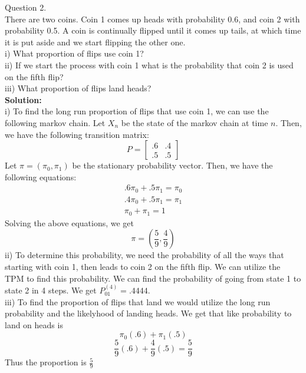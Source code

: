 \documentclass[answers,12pt,addpoints]{exam}
\begin{document}
\begin{questions}
\question Question 2.\\
There are two coins. Coin 1 comes up heads with probability 0.6, and coin 2 with probability 0.5.
A coin is continually flipped until it comes up tails, at which time it is put aside and we start
flipping the other one.\\
i) What proportion of flips use coin 1?\\
ii)  If we start the process with coin 1 what is the probability that coin 2 is used on the fifth flip? \\
iii) What proportion of flips land heads?\\
\textbf{Solution:}\\
i) To find the long run proportion of flips that use coin 1, we can use the following markov chain. Let $X_n$ be the state of the markov chain at time $n$. Then, we have the following transition matrix:
$$P = \begin{bmatrix}
    .6 & .4\\
    .5 & .5
\end{bmatrix}$$
Let $\pi = (\pi_0, \pi_1)$ be the stationary probability vector. Then, we have the following equations:
\begin{align*}
    .6\pi_0 + .5\pi_1 = \pi_0\\
    .4\pi_0 + .5\pi_1 = \pi_1\\
    \pi_0 + \pi_1 = 1
\end{align*}
Solving the above equations, we get
$$ \pi = (\frac{5}{9}, \frac{4}{9})$$
ii) To determine this probability, we need the probability of all the ways that starting with coin 1, then leads to coin 2 on the fifth flip. We can utilize the TPM to find this probability. We can find the probability of going from state 1 to state 2 in 4 steps. We get $P_{01}^{(4)} = .4444$.\\

iii) To find the proportion of flips that land we would utilize the long run probability and the likelyhood of landing heads. We get that like probability to land on heads is 
$$ \pi_0(.6) + \pi_1(.5)$$
$$ \frac{5}{9}(.6) + \frac{4}{9}(.5) = \frac{5}{9}$$
Thus the proportion is $\frac{5}{9}$


\end{questions}
\end{document}
